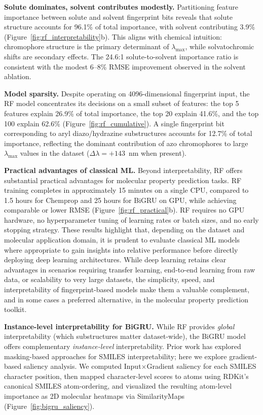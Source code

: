 \textbf{Solute dominates, solvent contributes modestly.}
Partitioning feature importance between solute and solvent fingerprint bits reveals that solute structure accounts for 96.1\% of total importance, with solvent contributing 3.9\% (Figure~\ref{fig:rf_interpretability}b).
This aligns with chemical intuition: chromophore structure is the primary determinant of $\lambda_{\max}$, while solvatochromic shifts are secondary effects.
The 24.6:1 solute-to-solvent importance ratio is consistent with the modest 6--8\% RMSE improvement observed in the solvent ablation.

\textbf{Model sparsity.}
Despite operating on 4096-dimensional fingerprint input, the RF model concentrates its decisions on a small subset of features: the top 5 features explain 26.9\% of total importance, the top 20 explain 41.6\%, and the top 100 explain 62.6\% (Figure~\ref{fig:rf_cumulative}).
A single fingerprint bit corresponding to aryl diazo/hydrazine substructures accounts for 12.7\% of total importance, reflecting the dominant contribution of azo chromophores to large $\lambda_{\max}$ values in the dataset ($\Delta\lambda = +143$~nm when present).

\textbf{Practical advantages of classical ML.}
Beyond interpretability, RF offers substantial practical advantages for molecular property prediction tasks.
RF training completes in approximately 15 minutes on a single CPU, compared to 1.5 hours for Chemprop and 25 hours for BiGRU on GPU, while achieving comparable or lower RMSE (Figure~\ref{fig:rf_practical}b).
RF requires no GPU hardware, no hyperparameter tuning of learning rates or batch sizes, and no early stopping strategy.
These results highlight that, depending on the dataset and molecular application domain, it is prudent to evaluate classical ML models where appropriate to gain insights into relative performance before directly deploying deep learning architectures.
While deep learning retains clear advantages in scenarios requiring transfer learning, end-to-end learning from raw data, or scalability to very large datasets, the simplicity, speed, and interpretability of fingerprint-based models make them a valuable complement, and in some cases a preferred alternative, in the molecular property prediction toolkit.

\textbf{Instance-level interpretability for BiGRU.}
While RF provides \emph{global} interpretability (which substructures matter dataset-wide), the BiGRU model offers complementary \emph{instance-level} interpretability.
Prior work has explored masking-based approaches for SMILES interpretability\cite{gohSMILES2VecInterpretableGeneralPurpose2018}; here we explore gradient-based saliency analysis\cite{simonyan2014deep}.
We computed Input$\times$Gradient saliency for each SMILES character position, then mapped character-level scores to atoms using RDKit's canonical SMILES atom-ordering\cite{landrumRdkitRdkit2020_03_12020}, and visualized the resulting atom-level importance as 2D molecular heatmaps via SimilarityMaps\cite{riniker2013similarity} (Figure~\ref{fig:bigru_saliency}).

